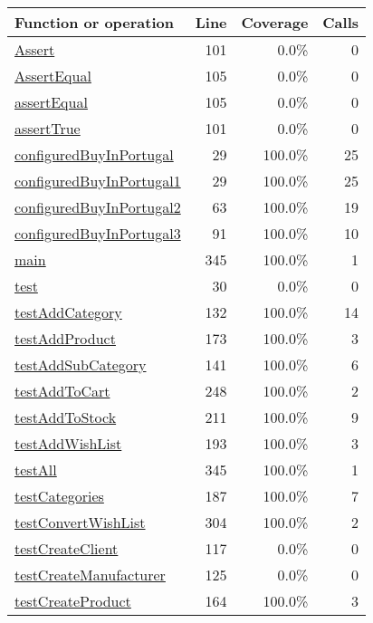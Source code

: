 \bigskip
\begin{longtable}{|l|r|r|r|}
\hline
Function or operation & Line & Coverage & Calls \\
\hline
\hline
\hyperref[Assert:101]{Assert} & 101&0.0\% & 0 \\
\hline
\hyperref[AssertEqual:105]{AssertEqual} & 105&0.0\% & 0 \\
\hline
\hyperref[assertEqual:105]{assertEqual} & 105&0.0\% & 0 \\
\hline
\hyperref[assertTrue:101]{assertTrue} & 101&0.0\% & 0 \\
\hline
\hyperref[configuredBuyInPortugal:29]{configuredBuyInPortugal} & 29&100.0\% & 25 \\
\hline
\hyperref[configuredBuyInPortugal1:29]{configuredBuyInPortugal1} & 29&100.0\% & 25 \\
\hline
\hyperref[configuredBuyInPortugal2:63]{configuredBuyInPortugal2} & 63&100.0\% & 19 \\
\hline
\hyperref[configuredBuyInPortugal3:91]{configuredBuyInPortugal3} & 91&100.0\% & 10 \\
\hline
\hyperref[main:345]{main} & 345&100.0\% & 1 \\
\hline
\hyperref[test:30]{test} & 30&0.0\% & 0 \\
\hline
\hyperref[testAddCategory:132]{testAddCategory} & 132&100.0\% & 14 \\
\hline
\hyperref[testAddProduct:173]{testAddProduct} & 173&100.0\% & 3 \\
\hline
\hyperref[testAddSubCategory:141]{testAddSubCategory} & 141&100.0\% & 6 \\
\hline
\hyperref[testAddToCart:248]{testAddToCart} & 248&100.0\% & 2 \\
\hline
\hyperref[testAddToStock:211]{testAddToStock} & 211&100.0\% & 9 \\
\hline
\hyperref[testAddWishList:193]{testAddWishList} & 193&100.0\% & 3 \\
\hline
\hyperref[testAll:345]{testAll} & 345&100.0\% & 1 \\
\hline
\hyperref[testCategories:187]{testCategories} & 187&100.0\% & 7 \\
\hline
\hyperref[testConvertWishList:304]{testConvertWishList} & 304&100.0\% & 2 \\
\hline
\hyperref[testCreateClient:117]{testCreateClient} & 117&0.0\% & 0 \\
\hline
\hyperref[testCreateManufacturer:125]{testCreateManufacturer} & 125&0.0\% & 0 \\
\hline
\hyperref[testCreateProduct:164]{testCreateProduct} & 164&100.0\% & 3 \\

\end{longtable}
